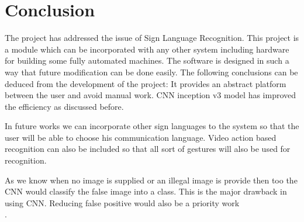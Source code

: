 \chapter{Conclusion}

\par
The project has addressed the issue of Sign Language Recognition. This project is a module which can be incorporated with any other system including hardware for building some fully automated machines. The software is designed in such a way that future modification can be
done easily. The following conclusions can be deduced from the development of the project: It provides an abstract platform between the user and avoid manual work.
CNN inception v3 model has improved the efficiency as discussed before.


In future works we can incorporate other sign languages to the system so that the user will be able to choose his communication language. Video action based recognition can also be included so that all sort of gestures will also be used for recognition.


As we know when no image is supplied or an illegal image is
provide then too the CNN would classify the false image into a
class. This is the major drawback in using CNN. Reducing false
positive would also be a priority work\\



.
